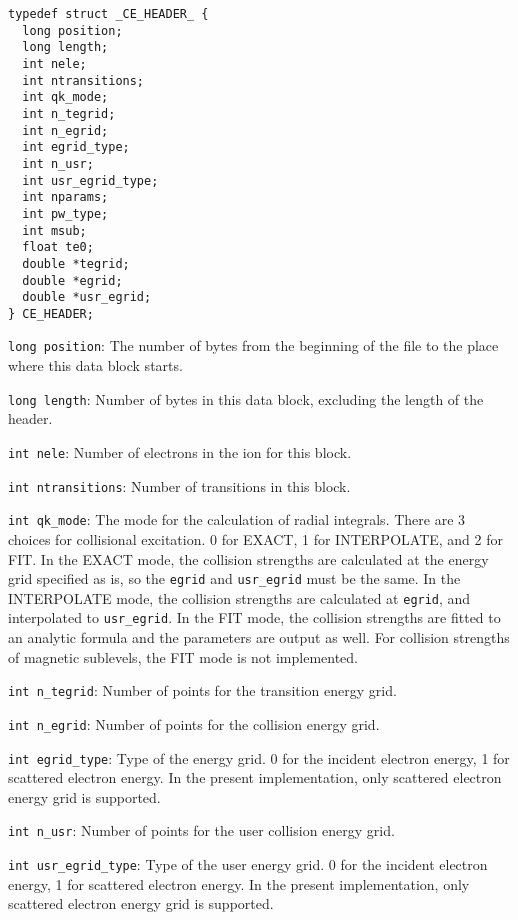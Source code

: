 \begin{verbatim}
typedef struct _CE_HEADER_ {
  long position;
  long length;
  int nele;
  int ntransitions;
  int qk_mode;
  int n_tegrid;
  int n_egrid;
  int egrid_type;
  int n_usr;
  int usr_egrid_type;
  int nparams;
  int pw_type;
  int msub;
  float te0;
  double *tegrid;
  double *egrid;
  double *usr_egrid;
} CE_HEADER;
\end{verbatim}

\begin{dbdesc}
\item[\texttt{long position}:] The number of bytes from the beginning of the
file to the place where this data block starts.
\item[\texttt{long length}:] Number of bytes in this data block, excluding the
length of the header.
\item[\texttt{int nele}:] Number of electrons in the ion for this block.
\item[\texttt{int ntransitions}:] Number of transitions in this block.
\item[\texttt{int qk\_mode}:] The mode for the calculation of radial
integrals. There are 3 choices for collisional excitation. 0 for EXACT, 1 for
INTERPOLATE, and 2 for FIT. In the EXACT mode, the collision strengths are
calculated at the energy grid specified as is, so the \texttt{egrid} and
\texttt{usr\_egrid} must be the same. In the INTERPOLATE mode, the collision
strengths are calculated at \texttt{egrid}, and interpolated to
\texttt{usr\_egrid}. In the FIT mode, the collision strengths are fitted to an
analytic formula and the parameters are output as well. For collision
strengths of magnetic sublevels, the FIT mode is not implemented.
\item[\texttt{int n\_tegrid}:] Number of points for the transition energy grid.
\item[\texttt{int n\_egrid}:] Number of points for the collision energy grid.
\item[\texttt{int egrid\_type}:] Type of the energy grid. 0 for the incident
electron energy, 1 for scattered electron energy. In the present
implementation, only scattered electron energy grid is supported.
\item[\texttt{int n\_usr}:] Number of points for the user collision energy
grid.
\item[\texttt{int usr\_egrid\_type}:] Type of the user energy grid. 0 for the
incident electron energy, 1 for scattered electron energy. In the present
implementation, only scattered electron energy grid is supported.

\end{dbdesc}

